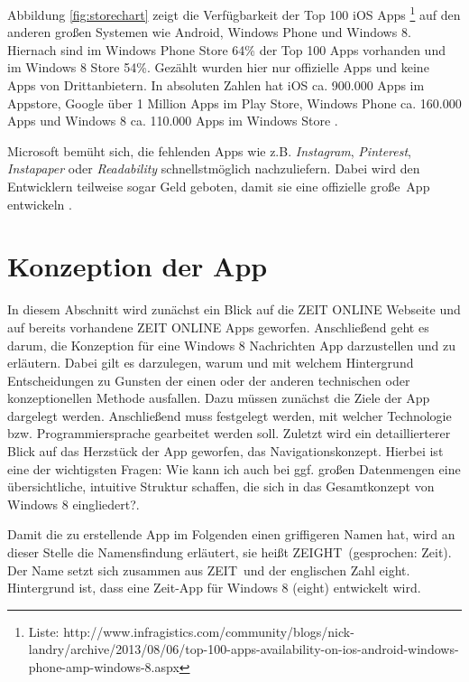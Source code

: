 \documentclass[12pt,a4paper,bibtotoc,abstracton]{scrartcl}
\begin{document}
Abbildung \ref{fig:storechart} zeigt die Verfügbarkeit der Top 100 iOS Apps \footnote{Liste: http://www.infragistics.com/community/blogs/nick-landry/archive/2013/08/06/top-100-apps-availability-on-ios-android-windows-phone-amp-windows-8.aspx} auf den anderen großen Systemen wie Android, Windows Phone und Windows 8. Hiernach sind im Windows Phone Store 64\% der Top 100 Apps vorhanden und im Windows 8 Store 54\%. Gezählt wurden hier nur offizielle Apps und keine Apps von Drittanbietern. In absoluten Zahlen hat iOS ca. 900.000 Apps im Appstore, Google über 1 Million Apps im Play Store, Windows Phone ca. 160.000 Apps und Windows 8 ca. 110.000 Apps im Windows Store \citep{WinbetaStore2013}.

Microsoft bemüht sich, die fehlenden Apps wie z.B. \textit{Instagram}, \textit{Pinterest}, \textit{Instapaper} oder \textit{Readability} schnellstmöglich nachzuliefern. Dabei wird den Entwicklern teilweise sogar Geld geboten, damit sie eine offizielle \glqq große\grqq\ App entwickeln \citep{WinbetaStore2013}.

\newpage
\section{Konzeption der App}
\label{sec:konzeption}
In diesem Abschnitt wird zunächst ein Blick auf die ZEIT ONLINE Webseite und auf bereits vorhandene ZEIT ONLINE Apps geworfen. Anschließend geht es darum, die Konzeption für eine Windows 8 Nachrichten App darzustellen und zu erläutern. Dabei gilt es darzulegen, warum und mit welchem Hintergrund Entscheidungen zu Gunsten der einen oder der anderen technischen oder konzeptionellen Methode ausfallen. Dazu müssen zunächst die Ziele der App dargelegt werden. Anschließend muss festgelegt werden, mit welcher Technologie bzw. Programmiersprache gearbeitet werden soll. Zuletzt wird ein detaillierterer Blick auf das Herzstück der App geworfen, das Navigationskonzept. Hierbei ist eine der wichtigsten Fragen: \glqq Wie kann ich auch bei ggf. großen Datenmengen eine übersichtliche, intuitive Struktur schaffen, die sich in das Gesamtkonzept von Windows 8 eingliedert?\grqq.

Damit die zu erstellende App im Folgenden einen griffigeren Namen hat, wird an dieser Stelle die Namensfindung erläutert, sie heißt \glqq ZEIGHT\grqq\ (gesprochen: Zeit). Der Name setzt sich zusammen aus \glqq ZEIT\grqq\ und der englischen Zahl \glqq eight\grqq. Hintergrund ist, dass eine \glqq Zeit\grqq-App für Windows 8 (eight) entwickelt wird.
\end{document}
